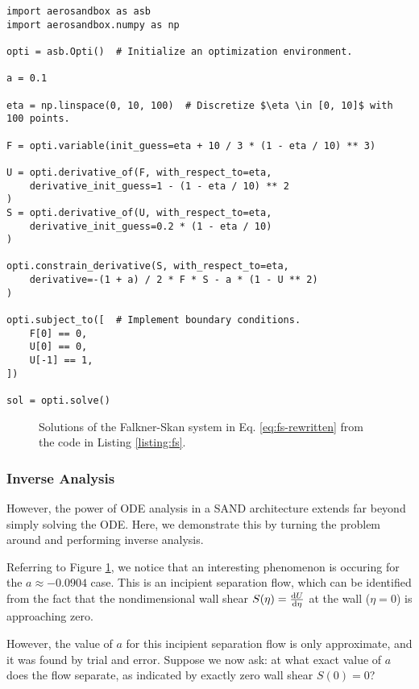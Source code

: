 \begin{listing}[H]
    \begin{verbatim}
import aerosandbox as asb
import aerosandbox.numpy as np

opti = asb.Opti()  # Initialize an optimization environment.

a = 0.1

eta = np.linspace(0, 10, 100)  # Discretize $\eta \in [0, 10]$ with 100 points.

F = opti.variable(init_guess=eta + 10 / 3 * (1 - eta / 10) ** 3)

U = opti.derivative_of(F, with_respect_to=eta,
    derivative_init_guess=1 - (1 - eta / 10) ** 2
)
S = opti.derivative_of(U, with_respect_to=eta,
    derivative_init_guess=0.2 * (1 - eta / 10)
)

opti.constrain_derivative(S, with_respect_to=eta,
    derivative=-(1 + a) / 2 * F * S - a * (1 - U ** 2)
)

opti.subject_to([  # Implement boundary conditions.
    F[0] == 0,
    U[0] == 0,
    U[-1] == 1,
])

sol = opti.solve()
    \end{verbatim}
    \caption{The AeroSandbox code to solve the Falkner-Skan system as in Eq. \ref{eq:fs-rewritten}.}
    \label{listing:fs}
\end{listing}

\begin{figure}[H]
    \centering
    \ifdraft{}{}
    \caption{Solutions of the Falkner-Skan system in Eq. \ref{eq:fs-rewritten} from the code in Listing \ref{listing:fs}.}
    \label{fig:fs}
\end{figure}

\subsubsection{Inverse Analysis}

However, the power of ODE analysis in a SAND architecture extends far beyond simply solving the ODE. Here, we demonstrate this by turning the problem around and performing inverse analysis.

Referring to Figure \ref{fig:fs}, we notice that an interesting phenomenon is occuring for the $a \approx -0.0904$ case. This is an incipient separation flow, which can be identified from the fact that the nondimensional wall shear $S(\eta) = \frac{\mathrm{d} U}{\mathrm{d} \eta}$ at the wall ($\eta = 0$) is approaching zero.

However, the value of $a$ for this incipient separation flow is only approximate, and it was found by trial and error. Suppose we now ask: at what exact value of $a$ does the flow separate, as indicated by exactly zero wall shear $S(0)=0$?

